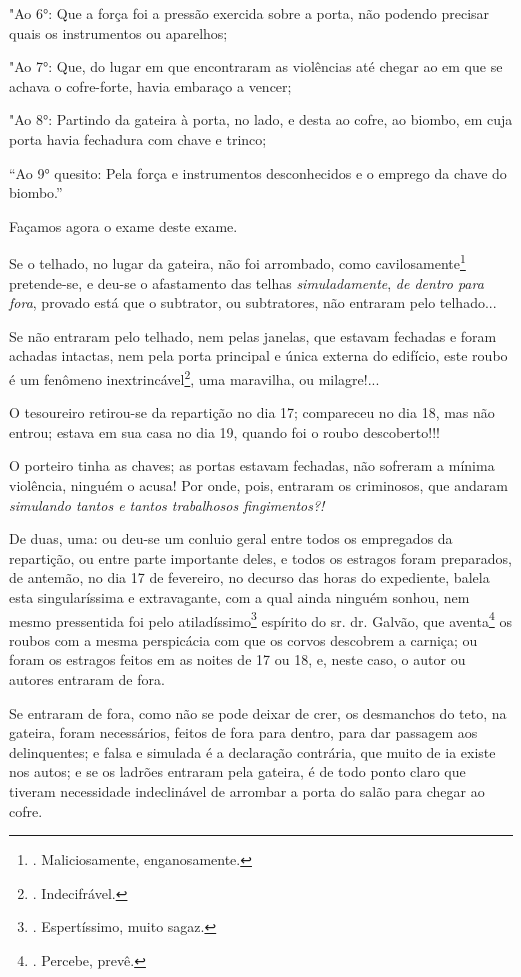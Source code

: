 "Ao 6°: Que a força foi a pressão exercida sobre a porta, não podendo
precisar quais os instrumentos ou aparelhos;

"Ao 7°: Que, do lugar em que encontraram as violências até chegar ao em
que se achava o cofre-forte, havia embaraço a vencer;

"Ao 8°: Partindo da gateira à porta, no lado, e desta ao cofre, ao
biombo, em cuja porta havia fechadura com chave e trinco;

``Ao 9° quesito: Pela força e instrumentos desconhecidos e o emprego da
chave do biombo.''

Façamos agora o exame deste exame.

Se o telhado, no lugar da gateira, não foi arrombado, como
cavilosamente\footnote{. Maliciosamente, enganosamente.} pretende-se, e
deu-se o afastamento das telhas \emph{simuladamente}, \emph{de dentro
para fora}, provado está que o subtrator, ou subtratores, não entraram
pelo telhado...

Se não entraram pelo telhado, nem pelas janelas, que estavam fechadas e
foram achadas intactas, nem pela porta principal e única externa do
edifício, este roubo é um fenômeno inextrincável\footnote{.
  Indecifrável.}, uma maravilha, ou milagre!...

O tesoureiro retirou-se da repartição no dia 17; compareceu no dia 18,
mas não entrou; estava em sua casa no dia 19, quando foi o roubo
descoberto!!!

O porteiro tinha as chaves; as portas estavam fechadas, não sofreram a
mínima violência, ninguém o acusa! Por onde, pois, entraram os
criminosos, que andaram \emph{simulando tantos e tantos trabalhosos
fingimentos?!}

De duas, uma: ou deu-se um conluio geral entre todos os empregados da
repartição, ou entre parte importante deles, e todos os estragos foram
preparados, de antemão, no dia 17 de fevereiro, no decurso das horas do
expediente, balela esta singularíssima e extravagante, com a qual ainda
ninguém sonhou, nem mesmo pressentida foi pelo atiladíssimo\footnote{.
  Espertíssimo, muito sagaz.} espírito do sr. dr. Galvão, que
aventa\footnote{. Percebe, prevê.} os roubos com a mesma perspicácia com
que os corvos descobrem a carniça; ou foram os estragos feitos em as
noites de 17 ou 18, e, neste caso, o autor ou autores entraram de fora.

Se entraram de fora, como não se pode deixar de crer, os desmanchos do
teto, na gateira, foram necessários, feitos de fora para dentro, para
dar passagem aos delinquentes; e falsa e simulada é a declaração
contrária, que muito de ia existe nos autos; e se os ladrões entraram
pela gateira, é de todo ponto claro que tiveram necessidade indeclinável
de arrombar a porta do salão para chegar ao cofre.

